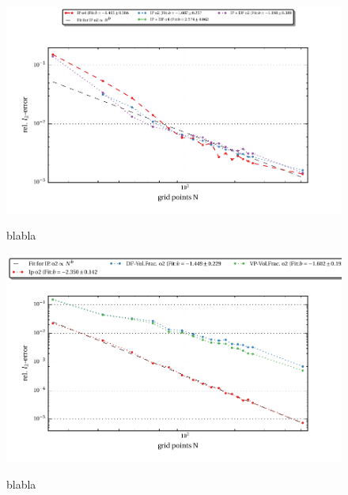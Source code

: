 \begin{figure}[!pt]
  \centering
  \includegraphics{gfx/immersed_boundary/tcflow/theo/ip.pdf}\label{fig:hpflow_ipgc_theo}
  \caption{blabla}
\end{figure}

\begin{figure}[!pb]
  \centering
  \includegraphics{gfx/immersed_boundary/hpflow/theo/all.pdf}\label{fig:hpflow_allgc_theo}
  \caption{blabla}
\end{figure}

\newpage




